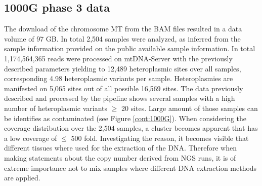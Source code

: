 \subsection{1000G phase 3 data}
The download of the chromosome MT from the BAM files resulted in a data volume of 97 GB. In total 2,504 samples were analyzed, as inferred from the sample information provided on the public available sample information. In total 1,174,564,365 reads were processed on mtDNA-Server with the previously described parameters yielding to 12,489 heteroplasmic sites over all samples, corresponding 4.98 heteroplasmic variants per sample. Heteroplasmies are manifested on 5,065 sites out of all possible 16,569 sites. 
The data previously described and processed by the pipeline shows several samples with a high number of heteroplasmic variants $\geq$ 20 sites. Large amount of those samples can be identifies as contaminated (see Figure \ref{cont:1000G}). When considering the coverage distribution over the 2,504 samples, a cluster becomes apparent that has a low coverage of $\leq$ 500 fold. Investigating the reason, it becomes visible that different tissues where used for the extraction of the DNA. Therefore when making statements about the copy number derived from NGS runs, it is of extreme importance not to mix samples where different DNA extraction methods are applied.


